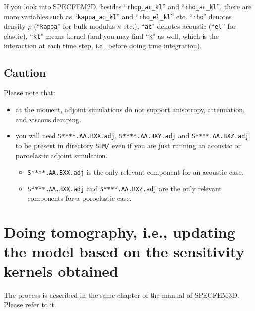 \documentclass[oneside,english,onecolumn,letterpaper]{book}
\begin{document}
If you look into SPECFEM2D, besides ``\texttt{rhop\_ac\_kl}'' and ``\texttt{rho\_ac\_kl}'',
there are more variables such as ``\texttt{kappa\_ac\_kl}'' and ``\texttt{rho\_el\_kl}'' etc.
``\texttt{rho}'' denotes density $\rho$ (``\texttt{kappa}'' for bulk modulus $\kappa$ etc.),
``\texttt{ac}'' denotes acoustic (``\texttt{el}'' for elastic),
``\texttt{kl}'' means kernel (and you may find ``\texttt{k}'' as well, which is the interaction at each time step, i.e., before doing time integration).

\section{Caution}

Please note that:
%
\begin{itemize}
\item at the moment, adjoint simulations do not support anisotropy, attenuation, and viscous damping.

\item you will need \texttt{S****.AA.BXX.adj}, \texttt{S****.AA.BXY.adj} and \texttt{S****.AA.BXZ.adj}
to be present in directory \texttt{SEM/} even if you are just running an acoustic or
poroelastic adjoint simulation.
  \begin{itemize}
    \item \texttt{S****.AA.BXX.adj} is the only relevant component for an acoustic case.
    \item \texttt{S****.AA.BXX.adj} and \texttt{S****.AA.BXZ.adj} are the only relevant components for a
poroelastic case.
  \end{itemize}
\end{itemize}



\chapter{Doing tomography, i.e., updating the model based on the sensitivity kernels obtained}


The process is described in the same chapter of the manual of SPECFEM3D. Please refer to it.


\end{document}
